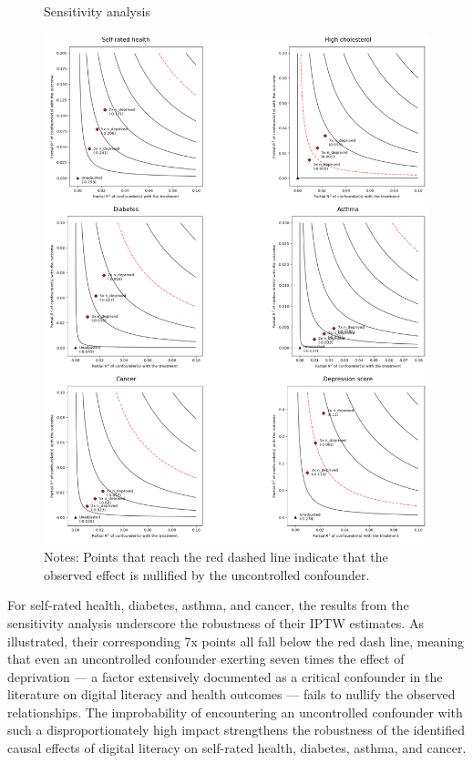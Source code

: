 \begin{figure}
    \centering
    \caption{Sensitivity analysis}
    \label{fig:sense}
    \includegraphics[width=\textwidth]{figures/sensitivity.png}
    \caption*{\footnotesize Notes: Points that reach the red dashed line indicate that the observed effect is nullified by the uncontrolled confounder.}
\end{figure}

For self-rated health, diabetes, asthma, and cancer, the results from the sensitivity analysis underscore the robustness of their IPTW estimates. As illustrated, their corresponding 7x points all fall below the red dash line, meaning that even an uncontrolled confounder exerting seven times the effect of deprivation — a factor extensively documented as a critical confounder in the literature on digital literacy and health outcomes \parencite[p. 212]{zelterman_applied_2015} — fails to nullify the observed relationships. The improbability of encountering an uncontrolled confounder with such a disproportionately high impact strengthens the robustness of the identified causal effects of digital literacy on self-rated health, diabetes, asthma, and cancer.

